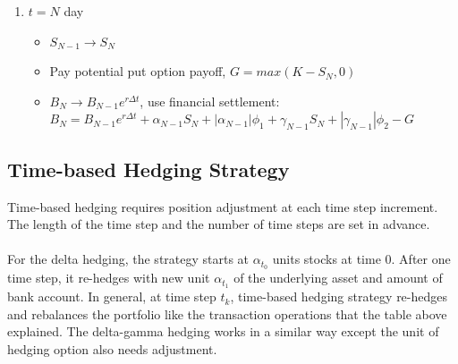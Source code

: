 \documentclass[12pt]{article}
\begin{document}
\begin{enumerate}
  \item $t=N$ day
  \begin{itemize}
    \item $S_{N-1} \rightarrow S_N$
    \item Pay potential put option payoff, $G = max(K-S_N,0)$
    \item $B_N \rightarrow B_{N-1}e^{r\Delta t}$, use financial settlement:\\
      $B_N = B_{N-1}e^{r\Delta t} + \alpha_{N-1}S_N + |\alpha_{N-1}|\phi_1 + \gamma_{N-1}S_N + |\gamma_{N-1}|\phi_2 - G$
  \end{itemize}
\end{enumerate}

\subsection{Time-based Hedging Strategy}
Time-based hedging requires position adjustment at each time step increment. The length of the time step and the number of time steps are set in advance.\\
\\For the delta hedging, the strategy starts at ${\alpha_{t_0}}$ units stocks at time 0. After one time step, it re-hedges with new unit ${\alpha_{t_1}}$ of the underlying asset and amount of bank account. In general, at time step ${t_k}$, time-based hedging strategy re-hedges and rebalances the portfolio like the transaction operations that the table above explained. The delta-gamma hedging works in a similar way except the unit of hedging option also needs adjustment.\\
 
\end{document}

